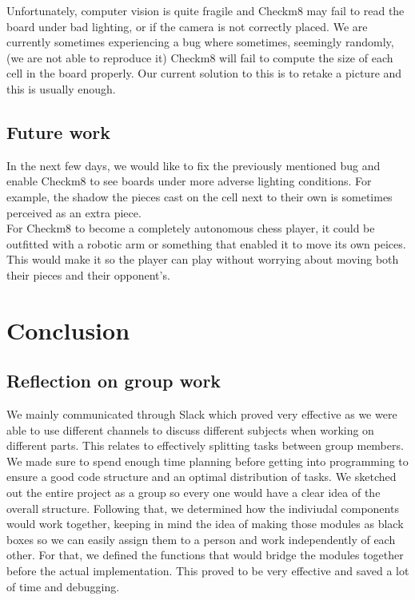 \documentclass[11pt]{article}
\begin{document}
Unfortunately, computer vision is quite fragile and Checkm8 may fail 
to read the board under bad lighting, or if the camera is not correctly 
placed. We are currently sometimes experiencing a bug where sometimes,
seemingly randomly, (we 
are not able to reproduce it) Checkm8 will fail to compute the size of each
cell in the board properly. Our current solution to this is to retake a picture
and this is usually enough.\\
\subsection{Future work}
In the next few days, we would like to fix the previously mentioned bug 
and enable Checkm8 to see boards under more adverse lighting conditions.
For example, the shadow the pieces cast on the cell next to their own is 
sometimes perceived as an extra piece. \\

For Checkm8 to become a completely autonomous chess player, it could 
be outfitted with a robotic arm or something that enabled it to move its 
own peices. This would make it so the player can play without worrying 
about moving both their pieces and their opponent's.\\
\section{Conclusion}
\subsection{Reflection on group work}
We mainly communicated through Slack which proved very effective as we were able
to use different channels to discuss different subjects when working on
different parts. This relates to effectively splitting tasks between group
members. We made sure to spend enough time planning before getting into
programming to ensure a good code structure and an optimal distribution of
tasks. We sketched out the entire project as a group so every one would have a
clear idea of the overall structure. Following that, we determined how the
indiviudal components would work together, keeping in mind the idea of making
those modules as black boxes so we can easily assign them to a person and work
independently of each other. For that, we defined the functions that would
bridge the modules together before the actual implementation. This proved to be
very effective and saved a lot of time and debugging.\\
\end{document}
